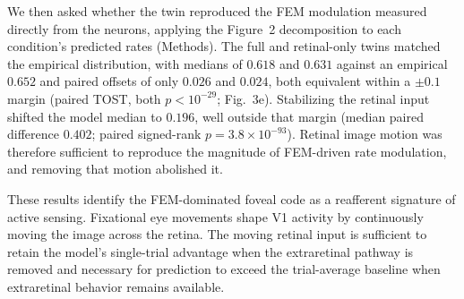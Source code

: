 \documentclass{lite}
\begin{document}
We then asked whether the twin reproduced the FEM modulation measured directly from the neurons, applying the Figure~2 decomposition to each condition's predicted rates (Methods). The full and retinal-only twins matched the empirical distribution, with medians of $0.618$ and $0.631$ against an empirical $0.652$ and paired offsets of only $0.026$ and $0.024$, both equivalent within a $\pm0.1$ margin (paired TOST, both $p < 10^{-29}$; Fig.~3e). Stabilizing the retinal input shifted the model median to $0.196$, well outside that margin (median paired difference $0.402$; paired signed-rank $p = 3.8\times10^{-93}$). Retinal image motion was therefore sufficient to reproduce the magnitude of FEM-driven rate modulation, and removing that motion abolished it.

These results identify the FEM-dominated foveal code as a reafferent signature of active sensing. Fixational eye movements shape V1 activity by continuously moving the image across the retina. The moving retinal input is sufficient to retain the model's single-trial advantage when the extraretinal pathway is removed and necessary for prediction to exceed the trial-average baseline when extraretinal behavior remains available.

\end{document}

